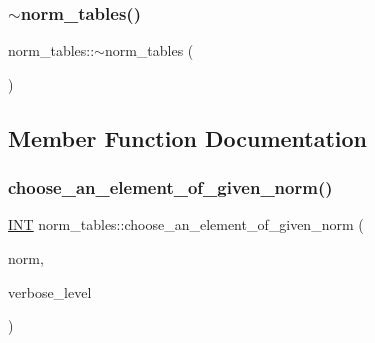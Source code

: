 \mbox{\label{classnorm__tables_a0caff2045f439b443c0fc36b9e5b4c27}} 
\subsubsection{\texorpdfstring{$\sim$norm\+\_\+tables()}{~norm\_tables()}}
{\footnotesize\ttfamily norm\+\_\+tables\+::$\sim$norm\+\_\+tables (\begin{DoxyParamCaption}{ }\end{DoxyParamCaption})}



\subsection{Member Function Documentation}
\mbox{\label{classnorm__tables_ade4d3a3b1e103c6005968dbbcdcc5aed}} 
\subsubsection{\texorpdfstring{choose\+\_\+an\+\_\+element\+\_\+of\+\_\+given\+\_\+norm()}{choose\_an\_element\_of\_given\_norm()}}
{\footnotesize\ttfamily \mbox{\hyperlink{galois_8h_a09fddde158a3a20bd2dcadb609de11dc}{I\+NT}} norm\+\_\+tables\+::choose\+\_\+an\+\_\+element\+\_\+of\+\_\+given\+\_\+norm (\begin{DoxyParamCaption}\item[{\mbox{\hyperlink{galois_8h_a09fddde158a3a20bd2dcadb609de11dc}{I\+NT}}}]{norm,  }\item[{\mbox{\hyperlink{galois_8h_a09fddde158a3a20bd2dcadb609de11dc}{I\+NT}}}]{verbose\+\_\+level }\end{DoxyParamCaption})}

\mbox{\label{classnorm__tables_a6b51503fa635de7a11cd9abb1cca331c}} 

